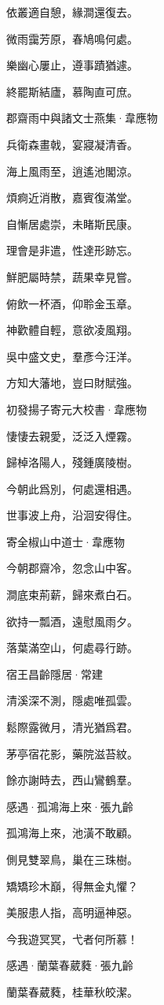 \documentclass[12pt,a4paper]{ctexbook}
\begin{document}
依叢適自憩，緣澗還復去。\par
微雨靄芳原，春鳩鳴何處。\par
樂幽心屢止，遵事蹟猶遽。\par
終罷斯結廬，慕陶直可庶。\par
郡齋雨中與諸文士燕集·韋應物\par
兵衛森畫戟，宴寢凝清香。\par
海上風雨至，逍遙池閣涼。\par
煩痾近消散，嘉賓復滿堂。\par
自慚居處崇，未睹斯民康。\par
理會是非遣，性達形跡忘。\par
鮮肥屬時禁，蔬果幸見嘗。\par
俯飲一杯酒，仰聆金玉章。\par
神歡體自輕，意欲凌風翔。\par
吳中盛文史，羣彥今汪洋。\par
方知大藩地，豈曰財賦強。\par
初發揚子寄元大校書·韋應物\par
悽悽去親愛，泛泛入煙霧。\par
歸棹洛陽人，殘鍾廣陵樹。\par
今朝此爲別，何處還相遇。\par
世事波上舟，沿洄安得住。\par
寄全椒山中道士·韋應物\par
今朝郡齋冷，忽念山中客。\par
澗底束荊薪，歸來煮白石。\par
欲持一瓢酒，遠慰風雨夕。\par
落葉滿空山，何處尋行跡。\par
宿王昌齡隱居·常建\par
清溪深不測，隱處唯孤雲。\par
鬆際露微月，清光猶爲君。\par
茅亭宿花影，藥院滋苔紋。\par
餘亦謝時去，西山鸞鶴羣。\par
感遇·孤鴻海上來·張九齡\par
孤鴻海上來，池潢不敢顧。\par
側見雙翠鳥，巢在三珠樹。\par
矯矯珍木巔，得無金丸懼？\par
美服患人指，高明逼神惡。\par
今我遊冥冥，弋者何所慕！\par
感遇·蘭葉春葳蕤·張九齡\par
蘭葉春葳蕤，桂華秋皎潔。\par
\end{document}
